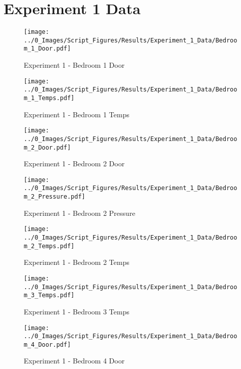 \clearpage		\large
\section{Experiment 1 Data} \label{App:Exp1Results} 

	\begin{figure}[H]
		\centering
		\texttt{[image: ../0\_Images/Script\_Figures/Results/Experiment\_1\_Data/Bedroom\_1\_Door.pdf]}
		\caption[]{Experiment 1 - Bedroom 1 Door}
	\end{figure}
 

	\begin{figure}[H]
		\centering
		\texttt{[image: ../0\_Images/Script\_Figures/Results/Experiment\_1\_Data/Bedroom\_1\_Temps.pdf]}
		\caption[]{Experiment 1 - Bedroom 1 Temps}
	\end{figure}
 
	\clearpage

	\begin{figure}[H]
		\centering
		\texttt{[image: ../0\_Images/Script\_Figures/Results/Experiment\_1\_Data/Bedroom\_2\_Door.pdf]}
		\caption[]{Experiment 1 - Bedroom 2 Door}
	\end{figure}
 

	\begin{figure}[H]
		\centering
		\texttt{[image: ../0\_Images/Script\_Figures/Results/Experiment\_1\_Data/Bedroom\_2\_Pressure.pdf]}
		\caption[]{Experiment 1 - Bedroom 2 Pressure}
	\end{figure}
 
	\clearpage

	\begin{figure}[H]
		\centering
		\texttt{[image: ../0\_Images/Script\_Figures/Results/Experiment\_1\_Data/Bedroom\_2\_Temps.pdf]}
		\caption[]{Experiment 1 - Bedroom 2 Temps}
	\end{figure}
 

	\begin{figure}[H]
		\centering
		\texttt{[image: ../0\_Images/Script\_Figures/Results/Experiment\_1\_Data/Bedroom\_3\_Temps.pdf]}
		\caption[]{Experiment 1 - Bedroom 3 Temps}
	\end{figure}
 
	\clearpage

	\begin{figure}[H]
		\centering
		\texttt{[image: ../0\_Images/Script\_Figures/Results/Experiment\_1\_Data/Bedroom\_4\_Door.pdf]}
		\caption[]{Experiment 1 - Bedroom 4 Door}
	\end{figure}
 

